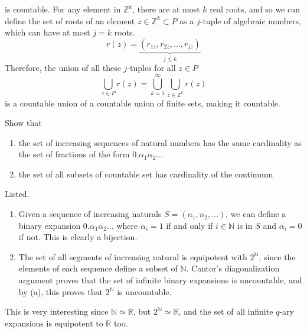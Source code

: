 \documentclass{article}
\begin{document}
\begin{solution}
\begin{enumerate}
        is countable. For any element in $\mathbb{Z}^k$, there are at most $k$ real roots, and so we can define the set of roots of an element $z \in \mathbb{Z}^k \subset P$ as a $j$-tuple of algebraic numbers, which can have at most $j=k$ roots. 
        \[r(z) = \underbrace{(r_{1z}, r_{2z}, \ldots, r_{jz})}_{j \leq k}\]
        Therefore, the union of all these $j$-tuples for all $z \in P$ 
        \[\bigcup_{z \in P} r(z) = \bigcup_{k = 1}^\infty \bigcup_{z \in \mathbb{Z}^k} r(z)\]
        is a countable union of a countable union of finite sets, making it countable. 
    \end{enumerate}
    \end{solution}

    \begin{exercise}[Zorich 2.4.4]
    Show that
    \begin{enumerate}
        \item the set of increasing sequences of natural numbers has the same cardinality as the set of fractions of the form $0.\alpha_1 \alpha_2 \ldots$ 
        \item the set of all subsets of countable set has cardinality of the continuum
    \end{enumerate}
    \end{exercise}

    \begin{solution}
    Listed. 
    \begin{enumerate}
        \item Given a sequence of increasing naturals $S = (n_1, n_2, \ldots)$, we can define a binary expansion $0.\alpha_1 \alpha_2 \ldots$ where $\alpha_i = 1$ if and only if $i \in \mathbb{N}$ is in $S$ and $\alpha_i = 0$ if not. This is clearly a bijection. 
        \item The set of all segments of increasing natural is equipotent with $2^\mathbb{N}$, since the elements of each sequence define a subset of $\mathbb{N}$. Cantor's diagonalization argument proves that the set of infinite binary expansions is uncountable, and by (a), this proves that $2^\mathbb{N}$ is uncountable. 
    \end{enumerate}
    This is very interesting since $\mathbb{N} \simeq \mathbb{R}$, but $2^{\mathbb{N}} \simeq \mathbb{R}$, and the set of all infinite $q$-ary expansions is equipotent to $\mathbb{R}$ too. 
    \end{solution}
\end{document}
